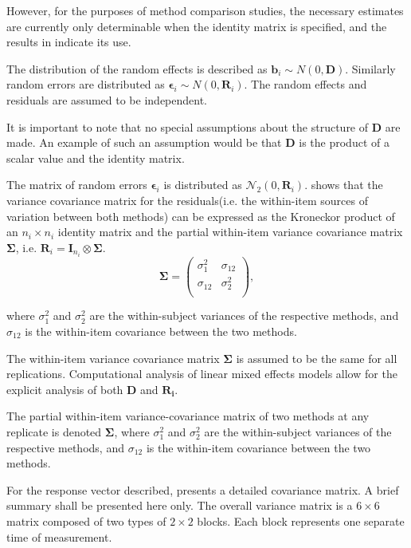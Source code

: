 \documentclass[12pt, a4paper]{report}
\theoremstyle{plain}
\theoremstyle{definition}
\theoremstyle{remark}
\begin{document}
	
	However, for the purposes of method comparison studies, the necessary estimates are currently only determinable when the identity matrix is specified, and the results in \citet{ARoy2009} indicate its use.
	
		The distribution of the random effects is described as $\boldsymbol{b}_i \sim N(0,\boldsymbol{D})$. Similarly  random errors are distributed as $\boldsymbol{\epsilon}_i \sim N(0,\boldsymbol{R}_i)$. The random effects and residuals are assumed to be independent.
		
		
		It is important to note that no special assumptions about the structure of $\boldsymbol{D}$ are made. An example of such an assumption would be that $\boldsymbol{D}$ is the product of a scalar value and the identity matrix.
		
		
		The matrix of random errors $\boldsymbol{\epsilon}_i$ is distributed as $\mathcal{N}_2(0,\boldsymbol{R}_i)$. \citet{hamlett} shows that the variance covariance matrix for the residuals(i.e. the within-item sources of variation between both methods) can be expressed as the Kroneckor product of an $n_i \times n_i$ identity matrix and the partial within-item variance covariance matrix $\boldsymbol{\Sigma}$, i.e. $\boldsymbol{R}_{i} = \boldsymbol{I}_{n_{i}} \otimes \boldsymbol{\Sigma}$.
		\[
		\boldsymbol{\Sigma} = \left( \begin{array}{cc}
		\sigma^2_{1} & \sigma_{12} \\
		\sigma_{12} & \sigma^2_{2} \\
		\end{array}\right),
		\]
		
		where $\sigma^2_{1}$ and $\sigma^2_{2}$ are the within-subject variances of the respective methods, and $\sigma_{12}$ is the within-item covariance between the two methods. 
		
		The within-item variance covariance matrix $\boldsymbol{\Sigma}$ is assumed to be the same for all replications. Computational analysis of linear mixed effects models allow for the explicit analysis of both $\boldsymbol{D}$ and $\boldsymbol{R_i}$. 
		
		The partial within-item variance-covariance matrix of two methods at any replicate is denoted $\boldsymbol{\Sigma}$, where $\sigma^2_{1}$ and $\sigma^2_{2}$ are the within-subject variances of the respective methods, and $\sigma_{12}$ is the within-item covariance between the two methods. 
		
		
	For the response vector described, \citet{hamlett} presents a detailed covariance matrix. A brief summary shall be presented here only. The overall variance matrix is a $6 \times 6$ matrix composed of two types of $2 \times 2$ blocks. Each block represents one separate time of measurement.
	
\end{document}
